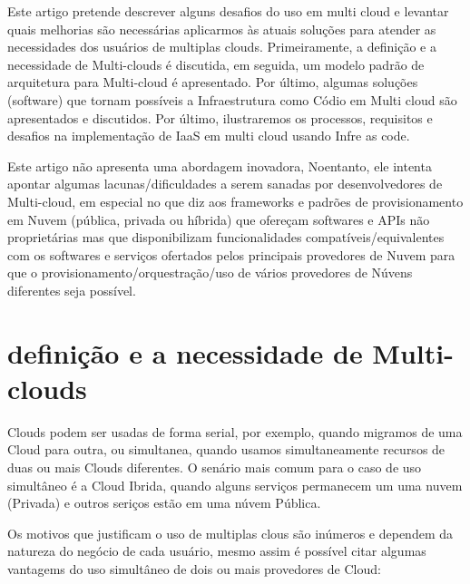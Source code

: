 \documentclass[12pt]{article}
\begin{document}
	    Este artigo pretende descrever alguns desafios do uso em multi cloud e levantar quais melhorias são necessárias aplicarmos às atuais soluções para atender as necessidades dos usuários de multiplas clouds. Primeiramente, a definição e a necessidade de Multi-clouds é discutida, em seguida, um modelo padrão de arquitetura para Multi-cloud é apresentado. Por último, algumas soluções (software) que tornam possíveis a Infraestrutura como Códio em Multi cloud são apresentados e discutidos. Por último, ilustraremos os processos, requisitos e desafios na implementação de IaaS em multi cloud usando Infre as code.
	    
	    Este artigo não apresenta uma abordagem inovadora, Noentanto, ele intenta apontar algumas lacunas/dificuldades a serem sanadas por desenvolvedores de Multi-cloud, em especial no que diz aos frameworks e padrões de provisionamento em Nuvem (pública, privada ou híbrida) que ofereçam softwares e APIs não proprietárias mas que disponibilizam funcionalidades compatíveis/equivalentes com os softwares e serviços ofertados pelos principais provedores de Nuvem para que o provisionamento/orquestração/uso de vários provedores de Núvens diferentes seja possível.
		
		
	\section{definição e a necessidade de Multi-clouds}
	
	Clouds podem ser usadas de forma serial, por exemplo, quando migramos de uma Cloud para outra, ou simultanea, quando usamos simultaneamente recursos de duas ou mais Clouds diferentes. O senário mais comum para o caso de uso simultâneo é a Cloud Ibrida, quando alguns serviços permanecem um uma nuvem (Privada) e outros seriços estão em uma núvem Pública.
	
	Os motivos que justificam o uso de multiplas clous são inúmeros e dependem da natureza do negócio de cada usuário, mesmo assim é possível citar algumas vantagems do uso simultâneo de dois ou mais provedores de Cloud:
	
\end{document}
